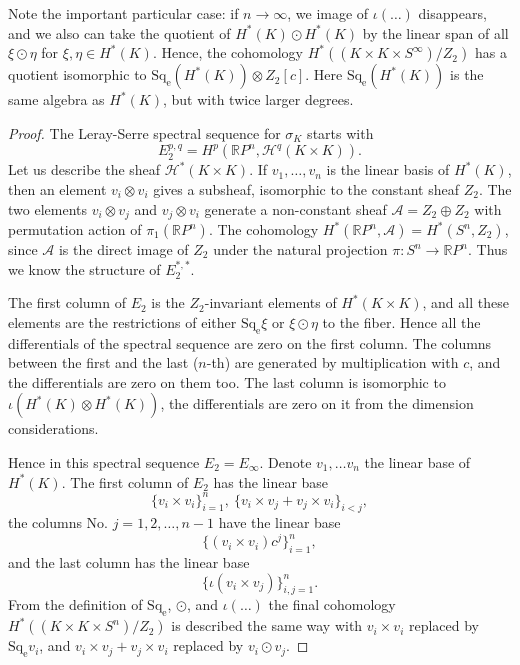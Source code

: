 \documentclass[12pt,a4paper]{amsart}
\theoremstyle{definition}
\theoremstyle{remark}
\begin{document}
Note the important particular case: if $n\to\infty$, we image of $\iota(\ldots)$ disappears, and we also can take the quotient of $H^*(K)\odot H^*(K)$ by the linear span of all $\xi\odot\eta$ for $\xi,\eta\in H^*(K)$. Hence, the cohomology $H^*((K\times K\times S^\infty)/Z_2)$ has a quotient isomorphic to $\operatorname{Sq_e}(H^*(K))\otimes Z_2[c]$. Here $\operatorname{Sq_e}(H^*(K))$ is the same algebra as $H^*(K)$, but with twice larger degrees.  

\begin{proof}
The Leray-Serre spectral sequence for $\sigma_K$ starts with 
$$
E_2^{p,q} = H^p(\mathbb RP^n, \mathcal H^q(K\times K)).
$$
Let us describe the sheaf $\mathcal H^*(K\times K)$. If  $v_1,\ldots, v_n$ is the linear basis of $H^*(K)$, then an element $v_i\otimes v_i$ gives a subsheaf, isomorphic to the constant sheaf $Z_2$. The two elements $v_i\otimes v_j$ and $v_j\otimes v_i$ generate a non-constant sheaf $\mathcal A = Z_2\oplus Z_2$ with permutation action of $\pi_1(\mathbb RP^n)$. The cohomology $H^*(\mathbb RP^n,\mathcal A) = H^*(S^n, Z_2)$, since $\mathcal A$ is the direct image of $Z_2$ under the natural projection $\pi: S^n\to \mathbb RP^n$. Thus we know the structure of $E_2^{*,*}$.

The first column of $E_2$ is the $Z_2$-invariant elements of $H^*(K\times K)$, and all these elements are the restrictions of either $\operatorname{Sq_e}\xi$ or $\xi\odot \eta$ to the fiber. Hence all the differentials of the spectral sequence are zero on the first column. The columns between the first and the last ($n$-th) are generated by multiplication with $c$, and the differentials are zero on them too. The last column is isomorphic to $\iota(H^*(K)\otimes H^*(K))$, the differentials are zero on it from the dimension considerations.

Hence in this spectral sequence $E_2=E_\infty$. Denote $v_1,\ldots v_n$ the linear base of $H^*(K)$. The first column of $E_2$ has the linear base 
$$
\{v_i\times v_i\}_{i=1}^n,\ \{v_i\times v_j+ v_j\times v_i\}_{i<j},
$$
the columns No. $j=1,2,\ldots,n-1$ have the linear base
$$
\{(v_i\times v_i)c^j\}_{i=1}^n,
$$ 
and the last column has the linear base
$$
\{\iota(v_i\times v_j)\}_{i,j=1}^n.
$$
From the definition of $\operatorname{Sq_e}$, $\odot$, and $\iota(\ldots)$ the final cohomology $H^*( (K\times K\times S^n)/Z_2)$ is described the same way with $v_i\times v_i$ replaced by $\operatorname{Sq_e} v_i$, and $v_i\times v_j+ v_j\times v_i$ replaced by $v_i\odot v_j$.
\end{proof}
\end{document}
